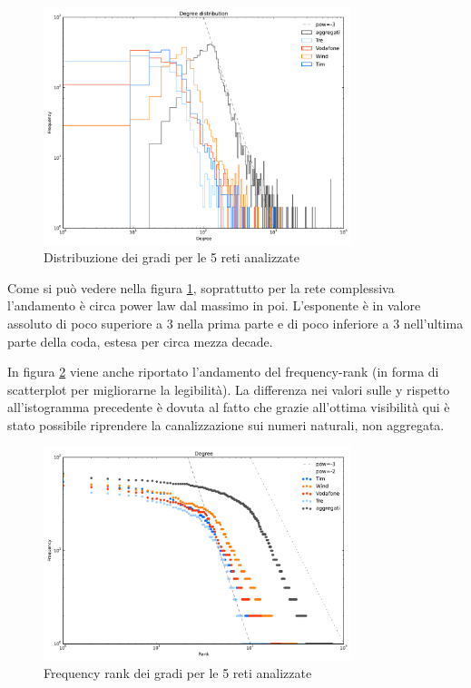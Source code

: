 \begin{figure}[b!]
	\centering
	\includegraphics[width=0.8\textwidth]{./Immagini/Dati/degreeDistribution}
	\caption{Distribuzione dei gradi per le 5 reti analizzate}
	\label{fig:gradi}
\end{figure}

Come si può vedere nella figura \ref{fig:gradi}, soprattutto per la rete complessiva l'andamento è circa power law dal massimo in poi. L'esponente è in valore assoluto di poco superiore a 3 nella prima parte e di poco inferiore a 3 nell'ultima parte della coda, estesa per circa mezza decade.

In figura \ref{fig:kfreqrank} viene anche riportato l'andamento del frequency-rank (in forma di scatterplot per migliorarne la legibilità). La differenza nei valori sulle y rispetto all'istogramma precedente è dovuta al fatto che grazie all'ottima visibilità qui è stato possibile riprendere la canalizzazione sui numeri naturali, non aggregata.

\begin{figure}[t]
	\centering
	\includegraphics[width=0.8\textwidth]{./Immagini/Dati/kfreqrank}
	\caption{Frequency rank dei gradi per le 5 reti analizzate}
	\label{fig:kfreqrank}
\end{figure}

